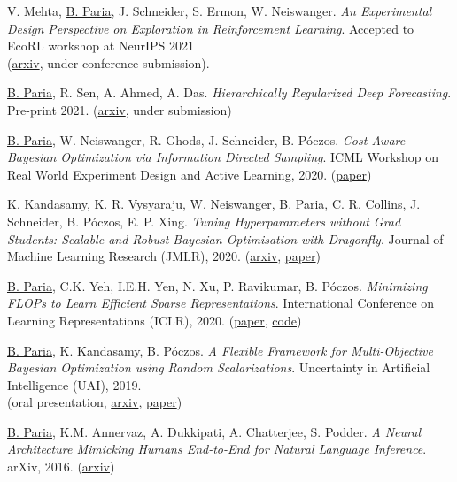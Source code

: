 \documentclass[10pt]{article}
\newcommand{\halfblankline}{\quad\vspace{-0.4\baselineskip}\pagebreak[3]}
\newcommand{\biswa}{\underline{B. Paria}}
\newcommand{\ambedkar}{A. Dukkipati}
\newcommand{\annervaz}{K.M. Annervaz}
\newcommand{\barnabas}{B. P\'oczos}
\newcommand{\samy}{K. Kandasamy}
\newcommand{\arxiv}[1]{arXiv, #1}
\begin{document}
V. Mehta, \biswa, J. Schneider, S. Ermon, W. Neiswanger. \emph{An Experimental Design Perspective on Exploration in Reinforcement Learning}. Accepted to EcoRL workshop at NeurIPS 2021\\
(\href{https://arxiv.org/abs/2112.05244}{arxiv}, under conference submission).
\\ \halfblankline

\biswa, R. Sen, A. Ahmed, A. Das. \emph{Hierarchically Regularized Deep Forecasting}. Pre-print 2021. (\href{https://arxiv.org/abs/2106.07630}{arxiv}, under submission)
\\ \halfblankline

\biswa, W. Neiswanger, R. Ghods, J. Schneider, \barnabas. \emph{Cost-Aware Bayesian Optimization via Information Directed Sampling}. ICML Workshop on Real World Experiment Design and Active Learning, 2020. (\href{https://realworldml.github.io/files/cr/29_Cost_Aware_BO_ICML_2020_Workshop.pdf}{paper})
\\ \halfblankline

\samy, K. R. Vysyaraju, W. Neiswanger, \biswa, C. R. Collins, J. Schneider, \barnabas, E. P. Xing. \emph{Tuning Hyperparameters without Grad Students: Scalable and Robust Bayesian Optimisation with Dragonfly}. Journal of Machine Learning Research (JMLR), 2020. (\href{https://arxiv.org/abs/1903.06694}{arxiv}, \href{https://jmlr.csail.mit.edu/papers/volume21/18-223/18-223.pdf}{paper})
\\ \halfblankline

\biswa, C.K. Yeh, I.E.H. Yen, N. Xu, P. Ravikumar, \barnabas. \emph{Minimizing FLOPs to Learn Efficient Sparse Representations}. International Conference on Learning Representations (ICLR), 2020. (\href{https://openreview.net/pdf?id=SygpC6Ntvr}{paper}, \href{https://github.com/biswajitsc/sparse-embed}{code})
\\ \halfblankline

\biswa, \samy, \barnabas. \emph{A Flexible Framework for Multi-Objective Bayesian Optimization using Random Scalarizations}. Uncertainty in Artificial Intelligence (UAI), 2019.\\
(oral presentation, \href{https://arxiv.org/abs/1805.12168}{arxiv}, \href{http://auai.org/uai2019/proceedings/papers/267.pdf}{paper})
\\ \halfblankline

\biswa, \annervaz, \ambedkar, A. Chatterjee, S. Podder. \emph{A Neural Architecture Mimicking Humans End-to-End for Natural Language Inference}. \arxiv{2016}. (\href{https://arxiv.org/abs/1611.04741}{arxiv})
\\ \halfblankline
\end{document}
